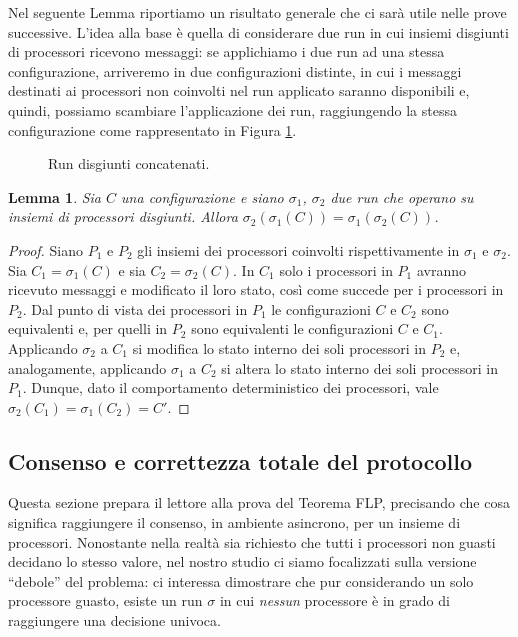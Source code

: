 \documentclass{article}
\newtheorem{lemma}{Lemma}
\begin{document}
Nel seguente Lemma riportiamo un risultato generale che ci sarà
utile nelle prove successive. L'idea alla base è quella di
considerare due run in cui insiemi disgiunti di processori ricevono
messaggi: se applichiamo i due run ad una stessa configurazione,
arriveremo in due configurazioni distinte, in cui i messaggi destinati
ai processori non coinvolti nel run applicato saranno disponibili e,
quindi, possiamo scambiare l'applicazione dei run, raggiungendo la
stessa configurazione come rappresentato in Figura \ref{fig:concatenazioneSchedule}.
\begin{figure}[!h]
  \centering \caption{Run
    disgiunti concatenati.}\label{fig:concatenazioneSchedule}
\end{figure}

\begin{lemma}
  \label{lemma:eventsInterleaving}
  Sia $C$ una configurazione e siano $\sigma_1$, $\sigma_2$ due run
  che operano su insiemi di processori disgiunti. Allora
  $\sigma_2(\sigma_1(C))=\sigma_1(\sigma_2(C))$.
\end{lemma}

\begin{proof}
  Siano $P_1$ e $P_2$ gli insiemi dei processori coinvolti
  rispettivamente in $\sigma_1$ e $\sigma_2$. Sia $C_1=\sigma_1(C)$ e
  sia $C_2=\sigma_2(C)$. In $C_1$ solo i processori in $P_1$ avranno
  ricevuto messaggi e modificato il loro stato, così come succede per
  i processori in $P_2$. Dal punto di vista dei processori in $P_1$ le
  configurazioni $C$ e $C_2$ sono equivalenti e, per quelli in $P_2$
  sono equivalenti le configurazioni $C$ e $C_1$. Applicando
  $\sigma_2$ a $C_1$ si modifica lo stato interno dei soli processori
  in $P_2$ e, analogamente, applicando $\sigma_1$ a $C_2$ si altera lo
  stato interno dei soli processori in $P_1$. Dunque, dato il
  comportamento deterministico dei processori, vale
  $\sigma_2(C_1)=\sigma_1(C_2)=C'$.
\end{proof}


\subsection{Consenso e correttezza totale del protocollo}

Questa sezione prepara il lettore alla prova del Teorema FLP,
precisando che cosa significa raggiungere il consenso, in ambiente
asincrono, per un insieme di processori. Nonostante nella realtà sia
richiesto che tutti i processori non guasti decidano lo stesso valore,
nel nostro studio ci siamo focalizzati sulla versione ``debole'' del
problema: ci interessa dimostrare che pur considerando un solo
processore guasto, esiste un run $\sigma$ in cui \emph{nessun}
processore è in grado di raggiungere una decisione univoca.
\end{document}
